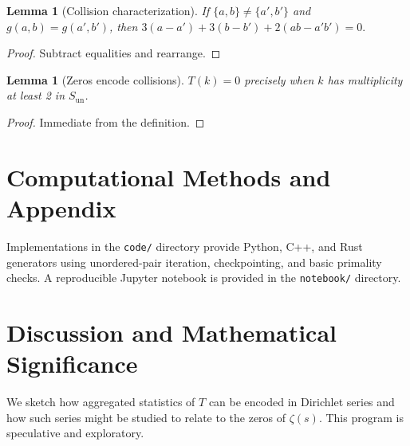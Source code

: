 \documentclass[12pt]{article}
\theoremstyle{definition}
\theoremstyle{plain}
\newtheorem{lemma}[definition]{Lemma}
\begin{document}
\begin{lemma}[Collision characterization]
If $\{a,b\}\ne\{a',b'\}$ and $g(a,b)=g(a',b')$, then
\(
3(a-a')+3(b-b')+2(ab-a'b')=0.
\)
\end{lemma}
\begin{proof}
Subtract equalities and rearrange.
\end{proof}

\begin{lemma}[Zeros encode collisions]
$T(k)=0$ precisely when $k$ has multiplicity at least 2 in $S_{\mathrm{un}}$.
\end{lemma}
\begin{proof}
Immediate from the definition.
\end{proof}

\section{Computational Methods and Appendix}
Implementations in the \texttt{code/} directory provide Python, C++, and Rust generators using unordered-pair iteration, checkpointing, and basic primality checks. A reproducible Jupyter notebook is provided in the \texttt{notebook/} directory.

\section{Discussion and Mathematical Significance}
We sketch how aggregated statistics of $T$ can be encoded in Dirichlet series and how such series might be studied to relate to the zeros of $\zeta(s)$. This program is speculative and exploratory.



\end{document}
